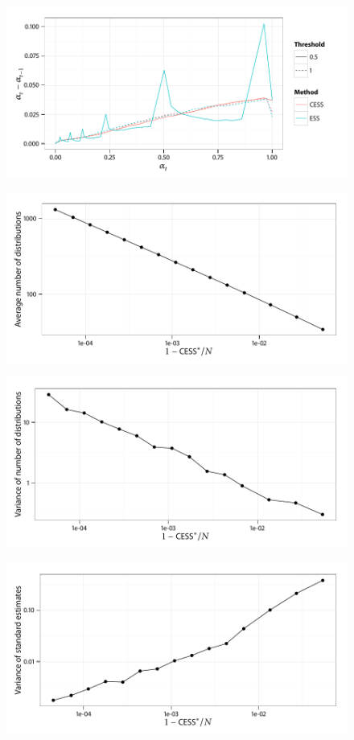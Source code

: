 \documentclass[11pt, fontset=Minion]{mthesis}
\begin{document}
\begin{figure}
  \includegraphics[width=\linewidth]{Adaptive_Dist}
\end{figure}

\begin{figure}
  \includegraphics[width=\linewidth]{CESS_Iter_Mean}
\end{figure}

\begin{figure}
  \includegraphics[width=\linewidth]{CESS_Iter_Var}
\end{figure}

\begin{figure}
  \includegraphics[width=\linewidth]{CESS_SMC_Var}
\end{figure}
\end{document}
